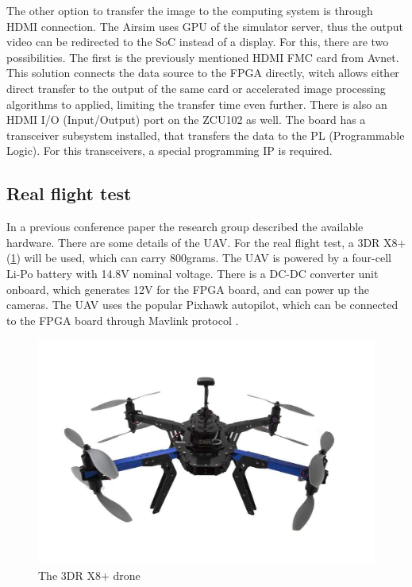 The other option to transfer the image to the computing system is through HDMI connection.
The Airsim uses GPU of the simulator server, thus the output video can be redirected to the SoC instead of a display.
For this, there are two possibilities.
The first is the previously mentioned HDMI FMC card from Avnet.
This solution connects the data source to the FPGA directly, witch allows either direct transfer to the output of the same card or accelerated image processing algorithms to applied, limiting the transfer time even further.
There is also an HDMI I/O (Input/Output) port on the ZCU102 as well.
The board has a transceiver subsystem installed, that transfers the data to the PL (Programmable Logic).
For this transceivers, a special programming IP is required.

\subsection{Real flight test} %
In a previous conference paper \cite{8798265} the research group described the available hardware.
There are some details of the UAV.
For the real flight test, a 3DR X8+ \cite{x8} (\cref{fig:drone}) will be used, which can carry 800grams.
The UAV is powered by a four-cell Li-Po battery with 14.8V nominal voltage.
There is a DC-DC converter unit onboard, which generates 12V for the FPGA board, and can power up the cameras.
The UAV uses the popular Pixhawk autopilot, which can be connected to the FPGA board through Mavlink protocol \cite{Fuller2014HardwareDA}.
\begin{figure}
    \centering
    \includegraphics[width=\linewidth]{images/3DR-X8.jpg}
    \caption{The 3DR X8+ drone}
    \label{fig:drone}
\end{figure}

